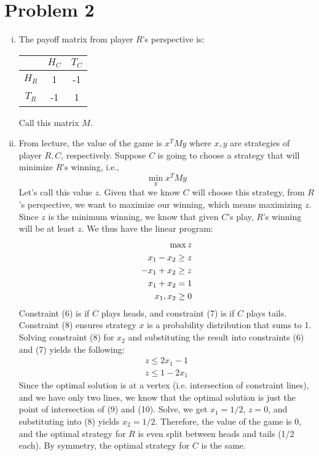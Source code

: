 \documentclass{article}
\begin{document}
\section*{Problem 2}
\begin{enumerate}[(i)]
\item The payoff matrix from player $R$'s perspective is:
\begin{center}
\begin{tabular}{c| c c}
      & $H_C$ & $T_C$ \\ \hline
$H_R$ & 1     & -1 \\
$T_R$ & -1    & 1 \\
\end{tabular}
\end{center}
Call this matrix $M$.

\item From lecture, the value of the game is $x^T M y$ where $x,y$ are strategies of player $R,C$, respectively.
Suppose $C$ is going to choose a strategy that will minimize $R$'s winning, i.e.,
$$\min_y x^T M y$$
Let's call this value $z$. Given that we know $C$ will choose this strategy, from $R$'s perspective, we want to maximize our winning, which means maximizing $z$. Since $z$ is the minimum winning, we know that given $C$'s play, $R$'s winning will be at least $z$. We thus have the linear program:
\begin{align}
\max z \notag \\
x_1-x_2 \geq z \\
-x_1+x_2 \geq z \\
x_1+x_2 = 1 \\
x_1,x_2\geq 0 \notag
\end{align}
Constraint (6) is if $C$ plays heads, and constraint (7) is if $C$ plays tails. Constraint (8) ensures strategy $x$ is a probability distribution that sums to 1. Solving constraint (8) for $x_2$ and substituting the result into constraints (6) and (7) yields the following:
\begin{align}
z\leq 2x_1-1 \\
z\leq 1-2x_1
\end{align}
Since the optimal solution is at a vertex (i.e. intersection of constraint lines), and we have only two lines, we know that the optimal solution is just the point of intersection of (9) and (10). Solve, we get $x_1=1/2$, $z=0$, and substituting into (8) yields $x_2=1/2$. Therefore, the value of the game is 0, and the optimal strategy for $R$ is even split between heads and tails (1/2 each). By symmetry, the optimal strategy for $C$ is the same.



\end{enumerate}
\end{document}
